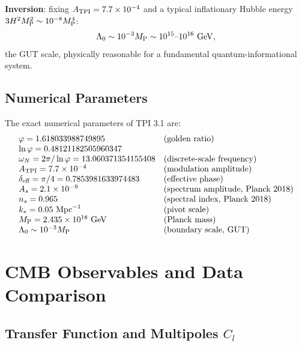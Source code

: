 \documentclass[11pt,a4paper]{article}
\theoremstyle{definition}
\begin{document}
\textbf{Inversion}: fixing $A_{\rm TPI} = 7.7 \times 10^{-4}$ and a typical inflationary Hubble energy $3H^2 M_{\rm P}^2 \sim 10^{-8} M_{\rm P}^4$:
\begin{equation}
\Lambda_0 \sim 10^{-3} M_{\rm P} \sim 10^{15}\text{--}10^{16} \text{ GeV},
\end{equation}
the GUT scale, physically reasonable for a fundamental quantum-informational system.

\subsection{Numerical Parameters}

The exact numerical parameters of TPI 3.1 are:
\begin{equation}
\begin{array}{ll}
\varphi = 1.618033988749895 & \text{(golden ratio)} \\
\ln\varphi = 0.48121182505960347 & \\
\omega_N = 2\pi/\ln\varphi = 13.060371354155408 & \text{(discrete-scale frequency)} \\
A_{\rm TPI} = 7.7 \times 10^{-4} & \text{(modulation amplitude)} \\
\delta_{\text{eff}} = \pi/4 = 0.7853981633974483 & \text{(effective phase)} \\
A_s = 2.1 \times 10^{-9} & \text{(spectrum amplitude, Planck 2018)} \\
n_s = 0.965 & \text{(spectral index, Planck 2018)} \\
k_* = 0.05 \text{ Mpc}^{-1} & \text{(pivot scale)} \\
M_{\rm P} = 2.435 \times 10^{18} \text{ GeV} & \text{(Planck mass)} \\
\Lambda_0 \sim 10^{-3} M_{\rm P} & \text{(boundary scale, GUT)} \\
\end{array}
\end{equation}

\section{CMB Observables and Data Comparison}\label{sec:cmb}

\subsection{Transfer Function and Multipoles $C_l$}
\end{document}
